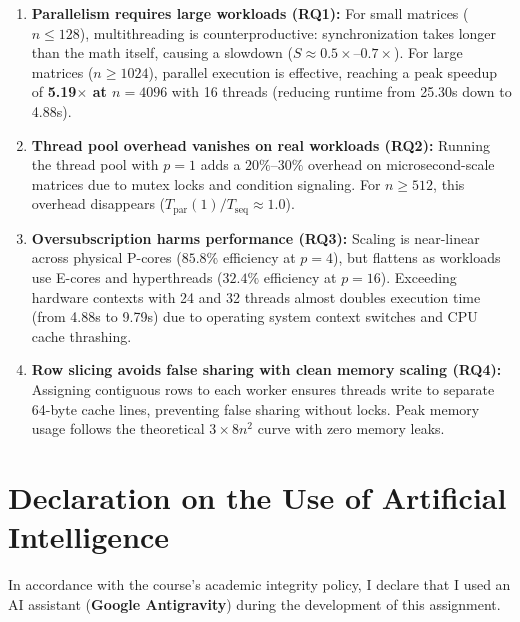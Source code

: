 \documentclass[11pt,a4paper]{article}
\begin{document}
\begin{enumerate}
    \item \textbf{Parallelism requires large workloads (RQ1):} For small matrices ($n \le 128$), multithreading is counterproductive: synchronization takes longer than the math itself, causing a slowdown ($S \approx 0.5\times\text{--}0.7\times$). For large matrices ($n \ge 1024$), parallel execution is effective, reaching a peak speedup of \textbf{5.19$\times$ at $n = 4096$} with 16 threads (reducing runtime from 25.30s down to 4.88s).
    
    \item \textbf{Thread pool overhead vanishes on real workloads (RQ2):} Running the thread pool with $p = 1$ adds a $20\%\text{--}30\%$ overhead on microsecond-scale matrices due to mutex locks and condition signaling. For $n \ge 512$, this overhead disappears ($T_{\text{par}}(1) / T_{\text{seq}} \approx 1.0$).
    
    \item \textbf{Oversubscription harms performance (RQ3):} Scaling is near-linear across physical P-cores ($85.8\%$ efficiency at $p = 4$), but flattens as workloads use E-cores and hyperthreads ($32.4\%$ efficiency at $p = 16$). Exceeding hardware contexts with 24 and 32 threads almost doubles execution time (from 4.88s to 9.79s) due to operating system context switches and CPU cache thrashing.
    
    \item \textbf{Row slicing avoids false sharing with clean memory scaling (RQ4):} Assigning contiguous rows to each worker ensures threads write to separate 64-byte cache lines, preventing false sharing without locks. Peak memory usage follows the theoretical $3 \times 8n^2$ curve with zero memory leaks.
\end{enumerate}

\section*{Declaration on the Use of Artificial Intelligence}

In accordance with the course's academic integrity policy, I declare that I used an AI assistant (\textbf{Google Antigravity}) during the development of this assignment. 
\end{document}
